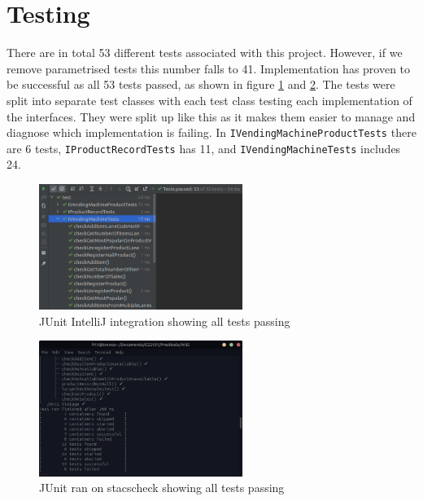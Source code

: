 \documentclass{article}
\begin{document}
\section{Testing}
There are in total 53 different tests associated with this project. However, if we remove parametrised tests this number falls to 41. Implementation has proven to be successful as all 53 tests passed, as shown in figure \ref{fig:test_results} and \ref{fig:test_results_console}. The tests were split into separate test classes with each test class testing each implementation of the interfaces. They were split up like this as it makes them easier to manage and diagnose which implementation is failing. In \verb+IVendingMachineProductTests+ there are 6 tests, \verb+IProductRecordTests+ has 11, and \verb+IVendingMachineTests+ includes 24.
\begin{figure}[h]
\centering
\includegraphics[width = 250px, clip]{test_results.png}
\caption{JUnit IntelliJ integration showing all tests passing}
\label{fig:test_results}
\end{figure}
\begin{figure}[h]
\centering
\includegraphics[width = 250px, clip]{test_results_console.png}
\caption{JUnit ran on stacscheck showing all tests passing}
\label{fig:test_results_console}
\end{figure}
\end{document}
